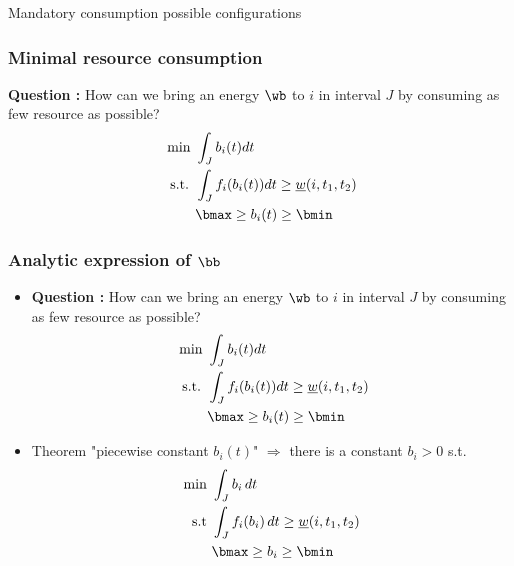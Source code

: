 \begin{frame}{Mandatory consumption possible configurations}
  
\end{frame}

\begin{frame}
  \frametitle{Minimal resource consumption}
  \begin{center}
    
  \end{center}
  \vfill
  \pause
  \textbf{Question : }
  How can we bring an energy $\wb$ to $i$ in interval $J$ by consuming
  as few resource as possible? 
  \vfill
  \pause
  \begin{align*}
    \text{ min }& \int_{J} b_i(t)dt  \\
    \text{ s.t. } & \int_{J}f_i(b_i(t))dt \ge  \underline{w}(i,t_1,t_2) \\
                &  \bmax \ge b_i(t) \ge \bmin
  \end{align*}
  \vfill
\end{frame}

\begin{frame}
  \frametitle{Analytic expression of $\bb$}
  \vfill
  \begin{itemize}
  \item  \textbf{Question : }
    How can we bring an energy $\wb$ to $i$ in interval $J$ by consuming as few resource as possible?
    \vfill
    \begin{align*}
      \text{ min }& \int_{J} b_i(t)dt  \\
      \text{ s.t. } & \int_{J}f_i(b_i(t))dt \ge  \underline{w}(i,t_1,t_2) \\
                  &  \bmax \ge b_i(t) \ge \bmin
    \end{align*}
    \vfill
    \pause
  \item Theorem "piecewise constant $b_i(t)$" $\Rightarrow$ there is a constant $b_{i} > 0 $
    s.t. 
    \pause
    \begin{align*}
      \text{min }  & \int_{J} b_i\,dt  \\
      \text{s.t } & \int_{J}f_i(b_i)\,dt \ge
                    \underline{w}(i,t_1,t_2)\\
                   & \bmax \ge b_i \ge \bmin
    \end{align*}
  \end{itemize}
  \vfill
\end{frame}

